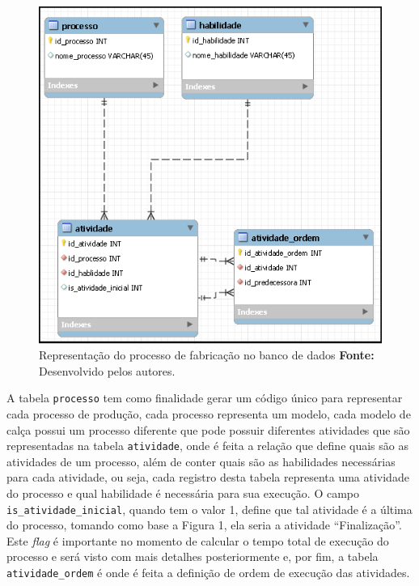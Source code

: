 \begin{figure}[h!]
	\centerline{\includegraphics[scale=0.7]{./imagens/representacao_processo.png}}
	\caption[Processo de fabricação]
	{Representação do processo de fabricação no banco de dados \textbf{Fonte:}
	Desenvolvido pelos autores.}
	\label{fig:exemplo1}
\end{figure}

\par A tabela \texttt{processo} tem como finalidade gerar um código único para representar 
cada processo de produção, cada processo representa um modelo, cada modelo
de calça possui um processo diferente que pode possuir diferentes atividades que
são representadas na tabela \texttt{atividade}, onde é feita a relação que define quais são as atividades de 
um processo,  além de conter quais são as habilidades necessárias para cada atividade, ou seja, cada registro desta 
tabela representa uma atividade do processo e qual habilidade é necessária para sua execução. O campo 
\texttt{is\_atividade\_inicial}, quando tem o valor 1, define que tal atividade
é a última do processo, tomando como base a Figura 1, ela seria a atividade ``Finalização''. Este
\textit{flag} é importante no momento de calcular o tempo total de execução do
processo e será visto com mais detalhes posteriormente e, por fim, a tabela
\texttt{atividade\_ordem} é onde é feita a definição de ordem de execução das
atividades.

